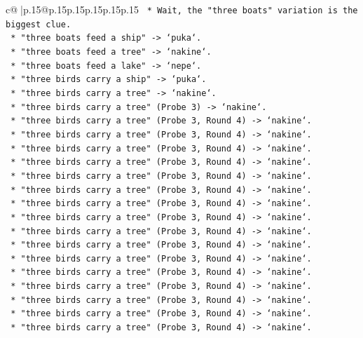 \documentclass{article}
\begin{document}
{\begin{supertabular}{c@{$\;$}|p{.15\linewidth}@{}p{.15\linewidth}p{.15\linewidth}p{.15\linewidth}p{.15\linewidth}p{.15\linewidth}}
{{{\texttt{    *   Wait, the "three boats" variation is the biggest clue.} \\
\texttt{    *   "three boats feed a ship" {-}> `puka`.} \\
\texttt{    *   "three boats feed a tree" {-}> `nakine`.} \\
\texttt{    *   "three boats feed a lake" {-}> `nepe`.} \\
\texttt{    *   "three birds carry a ship" {-}> `puka`.} \\
\texttt{    *   "three birds carry a tree" {-}> `nakine`.} \\
\texttt{    *   "three birds carry a tree" (Probe 3) {-}> `nakine`.} \\
\texttt{    *   "three birds carry a tree" (Probe 3, Round 4) {-}> `nakine`.} \\
\texttt{    *   "three birds carry a tree" (Probe 3, Round 4) {-}> `nakine`.} \\
\texttt{    *   "three birds carry a tree" (Probe 3, Round 4) {-}> `nakine`.} \\
\texttt{    *   "three birds carry a tree" (Probe 3, Round 4) {-}> `nakine`.} \\
\texttt{    *   "three birds carry a tree" (Probe 3, Round 4) {-}> `nakine`.} \\
\texttt{    *   "three birds carry a tree" (Probe 3, Round 4) {-}> `nakine`.} \\
\texttt{    *   "three birds carry a tree" (Probe 3, Round 4) {-}> `nakine`.} \\
\texttt{    *   "three birds carry a tree" (Probe 3, Round 4) {-}> `nakine`.} \\
\texttt{    *   "three birds carry a tree" (Probe 3, Round 4) {-}> `nakine`.} \\
\texttt{    *   "three birds carry a tree" (Probe 3, Round 4) {-}> `nakine`.} \\
\texttt{    *   "three birds carry a tree" (Probe 3, Round 4) {-}> `nakine`.} \\
\texttt{    *   "three birds carry a tree" (Probe 3, Round 4) {-}> `nakine`.} \\
\texttt{    *   "three birds carry a tree" (Probe 3, Round 4) {-}> `nakine`.} \\
\texttt{    *   "three birds carry a tree" (Probe 3, Round 4) {-}> `nakine`.} \\
\texttt{    *   "three birds carry a tree" (Probe 3, Round 4) {-}> `nakine`.} \\
\texttt{    *   "three birds carry a tree" (Probe 3, Round 4) {-}> `nakine`.} \\
}}}
\end{supertabular}}
\end{document}
